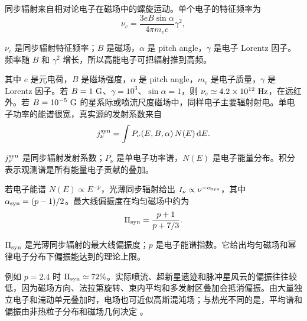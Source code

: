 同步辐射来自相对论电子在磁场中的螺旋运动。单个电子的特征频率为
\begin{equation}
  \nu_c=\frac{3eB\sin\alpha}{4\pi m_ec}\gamma^2 ,
  \label{eq:ch09-synch-critical}
\end{equation}
\begin{formulaexplain}
\(\nu_c\) 是同步辐射特征频率；\(B\) 是磁场，\(\alpha\) 是 pitch angle，\(\gamma\) 是电子 Lorentz 因子。频率随 \(B\) 和 \(\gamma^2\) 增长，所以高能电子可把辐射推到高频。
\end{formulaexplain}
其中 \(e\) 是元电荷，\(B\) 是磁场强度，\(\alpha\) 是 pitch angle，\(m_e\) 是电子质量，\(\gamma\) 是 Lorentz 因子。若 \(B=1~{\rm G}\)、\(\gamma=10^3\)、\(\sin\alpha=1\)，则 \(\nu_c\simeq4.2\times10^{12}~{\rm Hz}\)，在远红外。若 \(B=10^{-5}~{\rm G}\) 的星系际或喷流尺度磁场中，同样电子主要辐射射电。单电子功率的能谱很宽，真实源的发射系数来自
\begin{equation}
  j_\nu^{\rm syn}=\int P_\nu(E,B,\alpha)\,N(E)\,{\rm d}E .
  \label{eq:ch09-synch-emissivity}
\end{equation}
\begin{formulaexplain}
\(j_\nu^{\rm syn}\) 是同步辐射发射系数；\(P_\nu\) 是单电子功率谱，\(N(E)\) 是电子能量分布。积分表示观测谱是所有能量电子贡献的叠加。
\end{formulaexplain}
若电子能谱 \(N(E)\propto E^{-p}\)，光薄同步辐射给出 \(I_\nu\propto\nu^{-\alpha_{\rm syn}}\)，其中 \(\alpha_{\rm syn}=(p-1)/2\)。最大线偏振度在均匀磁场中约为
\begin{equation}
  \Pi_{\rm syn}=\frac{p+1}{p+7/3}.
  \label{eq:ch09-synch-polarization}
\end{equation}
\begin{formulaexplain}
\(\Pi_{\rm syn}\) 是光薄同步辐射的最大线偏振度；\(p\) 是电子能谱指数。它给出均匀磁场和幂律电子分布下偏振能达到的理论上限。
\end{formulaexplain}
例如 \(p=2.4\) 时 \(\Pi_{\rm syn}\simeq72\%\)。实际喷流、超新星遗迹和脉冲星风云的偏振往往较低，因为磁场方向、法拉第旋转、束内平均和多发射区叠加会抵消偏振。由大量独立电子和湍动单元叠加时，电场也可近似高斯混沌场；与热光不同的是，平均谱和偏振由非热粒子分布和磁场几何决定 \citep{1965ARA&A...3..297G,1970RvMP...42..237B,1978bllo.conf..328B,2012ApJ...752..157Z}。

